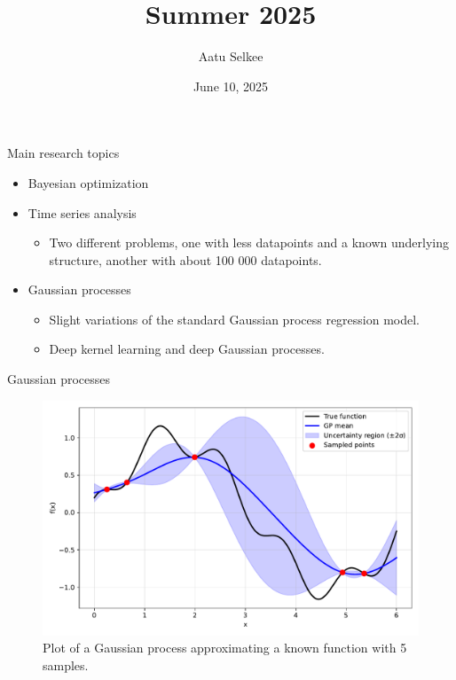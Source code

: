 \documentclass{beamer}
\title{Summer 2025}
\author{Aatu Selkee}
\date{June 10, 2025}
\begin{document}
\frame{\titlepage}


\begin{frame}{Main research topics}
    \begin{itemize}
        \item Bayesian optimization
        \item Time series analysis
        \begin{itemize}
            \item Two different problems, one with less datapoints and a known underlying structure, another with about 100 000 datapoints.
        \end{itemize}
        \item Gaussian processes
        \begin{itemize}
            \item Slight variations of the standard Gaussian process regression model.
            \item Deep kernel learning and deep Gaussian processes.
        \end{itemize}
    \end{itemize}
\end{frame}

\begin{frame}{Gaussian processes}
    \begin{figure}
        \centering
        \includegraphics[width=\textwidth]{./July presentation/sausage_plot.pdf}
        \caption{Plot of a Gaussian process approximating a known function with 5 samples.}
    \end{figure}
\end{frame}
\end{document}
